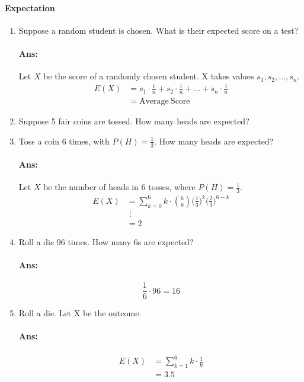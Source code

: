 \documentclass[letterpaper,12pt]{article}
\begin{document}
\paragraph{Expectation}
\begin{enumerate}
    \item Suppose a random student is chosen. What is their expected score on a test?
        \paragraph{Ans:}Let $X$ be the score of a randomly chosen student. X takes values 
        $s_1, s_2, \ldots, s_n$.
        \begin{align*}
            E(X) &= s_1 \cdot \frac{1}{n} + s_2 \cdot \frac{1}{n} + \ldots + s_n \cdot \frac{1}{n}\\
                 &= \mathrm{Average~Score}
        \end{align*}
    \item Suppose 5 fair coins are tossed. How many heads are expected? 
    \item Toss a coin 6 times, with $P(H) = \frac{1}{3}$. How many heads are expected?
        \paragraph{Ans:}Let $X$ be the number of heads in 6 tosses, where $P(H) = \frac{1}{3}$. 
        \begin{align*}
            E(X) &= \sum_{k=0}^6 k\cdot\binom{6}{k}\bigg(\frac{1}{3}\bigg)^k\bigg(\frac{2}{3}\bigg)^{6-k}\\
                 &\,\,\vdots\\
                 &= 2
        \end{align*}
    \item Roll a die 96 times. How many 6s are expected?
        \paragraph{Ans:} $$\frac{1}{6} \cdot 96 = 16$$
    \item Roll a die. Let X be the outcome.
        \paragraph{Ans:}
        \begin{align*}
            E(X) &= \sum_{k=1}^6 k\cdot \frac{1}{6}\\
                 &= 3.5
        \end{align*}
\end{enumerate}
\end{document}
